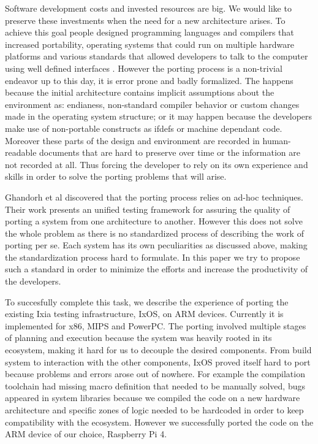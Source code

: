 \documentclass[12pt,a4paper]{report}
\begin{document}
Software development costs and invested resources are big. We would like to preserve these
investments when the need for a new architecture arises. To achieve this goal people designed
programming languages and compilers that increased portability, operating systems that could run
on multiple hardware platforms \cite{johnson1978unix} and various standards that allowed developers
to talk to the computer using well defined interfaces \cite{walli1995posix}. However the porting
process is a non-trivial endeavor up to this day, it is error prone and badly formalized. The
happens because the initial architecture contains implicit assumptions about the environment as:
endianess, non-standard compiler behavior or custom changes made in the operating system structure;
or it may happen because the developers make use of non-portable constructs as ifdefs
\cite{spencer1992ifdef} or machine dependant code. Moreover these parts of the design and
environment are recorded in human-readable documents that are hard to preserve over time or the
information are not recorded at all. Thus forcing the developer to rely on its own experience and
skills in order to solve the porting problems that will arise.

Ghandorh et al \cite{ghandorh2020systematic} discovered that the porting process relies on ad-hoc
techniques. Their work presents an unified testing framework for assuring the quality of porting
a system from one architecture to another. However this does not solve the whole problem as there
is no standardized process of describing the work of porting per se. Each system has its own
peculiarities as discussed above, making the standardization process hard to formulate. In this
paper we try to propose such a standard in order to minimize the efforts and increase the
productivity of the developers.

To succesfully complete this task, we describe the experience of porting the existing Ixia testing
infrastructure, IxOS, on ARM devices. Currently it is implemented for x86, MIPS and PowerPC. The
porting involved multiple stages of planning and execution because the system was heavily rooted
in its ecosystem, making it hard for us to decouple the desired components. From build system to
interaction with the other components, IxOS proved itself hard to port because problems and errors
arose out of nowhere. For example the compilation toolchain had missing macro definition that needed
to be manually solved, bugs appeared in system libraries because we compiled the code on a new
hardware architecture and specific zones of logic needed to be hardcoded in order to keep
compatibility with the ecosystem. However we successfully ported the code on the ARM device of our
choice, Raspberry Pi 4.
\end{document}
